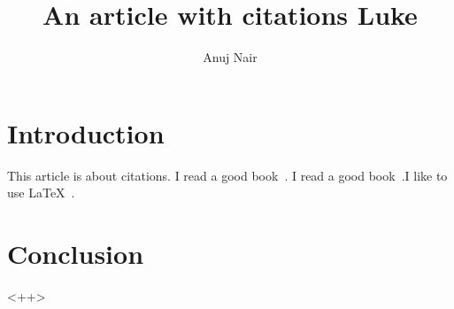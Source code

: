 \documentclass{article}
\title{ An article with citations Luke }
\author{Anuj Nair}
\date{}
\begin{document}
\maketitle

\section{Introduction}
This article is about citations. I read a good book~\cite{smith2012}. I read a good book~\cite{hall2013}.I like to use {\LaTeX}~\cite{latex}.
				

\printbibliography


\section{Conclusion}

<++>
\end{document}
